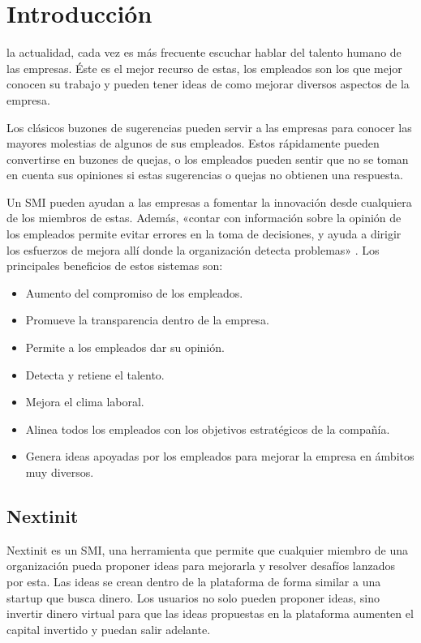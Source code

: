 \chapter{Introducción}

 la actualidad, cada vez es más frecuente escuchar hablar del talento humano de las empresas. Éste es el mejor recurso de estas,
 los empleados son los que mejor conocen su trabajo y pueden tener ideas de como mejorar diversos aspectos de la empresa. 
 
 Los clásicos buzones de sugerencias pueden servir a las empresas para conocer las mayores molestias de algunos de sus empleados. Estos 
 rápidamente pueden convertirse en buzones de quejas, o los empleados pueden sentir que no se toman en cuenta sus opiniones si estas 
 sugerencias o quejas no obtienen una respuesta.
 
 Un \acf{SMI} pueden ayudan a las empresas a fomentar la innovación desde cualquiera de los miembros de 
 estas. Además, «contar con información sobre la opinión de los empleados permite evitar errores en la toma de decisiones, y 
 ayuda a dirigir los esfuerzos de mejora allí donde la organización detecta problemas» \cite{talento}. Los principales beneficios de estos sistemas son:
 
 \begin{itemize}
 	\item Aumento del compromiso de los empleados.
 	\item Promueve la transparencia dentro de la empresa.
 	\item Permite a los empleados dar su opinión.
 	\item Detecta y retiene el talento.
 	\item Mejora el clima laboral.
 	\item Alinea todos los empleados con los objetivos estratégicos de la compañía.
 	\item Genera ideas apoyadas por los empleados para mejorar la empresa en ámbitos muy diversos.
 \end{itemize}
 
 
 \section{Nextinit}
 
 Nextinit es un \acs{SMI}, una herramienta que permite que cualquier miembro de una organización pueda proponer ideas para
 mejorarla y resolver desafíos lanzados por esta. Las ideas se crean dentro de la plataforma de forma similar a una startup que busca dinero. Los 
 usuarios no solo pueden  proponer ideas, sino invertir dinero virtual para que las ideas propuestas en la plataforma aumenten el capital invertido 
 y puedan salir adelante.
 
